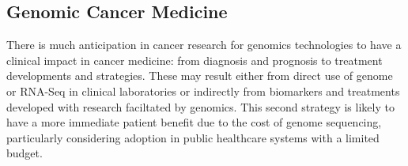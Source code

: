 



\subsection{Genomic Cancer Medicine}
There is much anticipation in cancer research for genomics technologies to have a clinical impact in cancer medicine: from diagnosis and prognosis to treatment developments and strategies. These may result either from direct use of genome or RNA-Seq in clinical laboratories or indirectly from biomarkers and treatments developed with research faciltated by genomics. This second strategy is likely to have a more immediate patient benefit due to the cost of genome sequencing, particularly considering adoption in public healthcare systems with a limited budget.  

